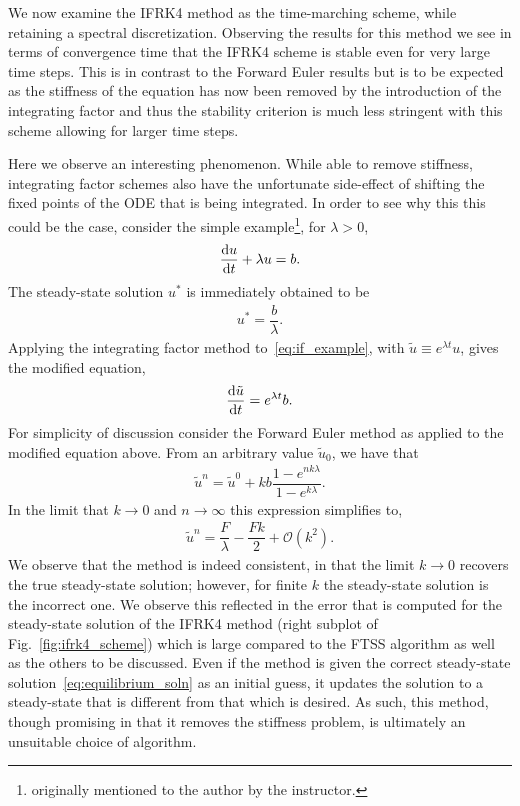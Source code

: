 \documentclass[11pt]{article}
\begin{document}
We now examine the IFRK4 method as the time-marching scheme, while retaining a spectral discretization. Observing the results for this method we see in terms of convergence time that the IFRK4 scheme is stable even for very large time steps. This is in contrast to the Forward Euler results but is to be expected as the stiffness of the equation has now been removed by the introduction of the integrating factor and thus the stability criterion is much less stringent with this scheme allowing for larger time steps. 

Here we observe an interesting phenomenon. While able to remove stiffness, integrating factor schemes also have the unfortunate side-effect of shifting the fixed points of the ODE that is being integrated. In order to see why this this could be the case, consider the simple example\footnote{originally mentioned to the author by the instructor.}, for $\lambda>0$,
\begin{align}
    \dv{u}{t} + \lambda u = b.\label{eq:if_example}
\end{align}
The steady-state solution $u^{*}$ is immediately obtained to be
\begin{align}
    u^{*} = \dfrac{b}{\lambda}.
\end{align}
Applying the integrating factor method to~\eqref{eq:if_example}, with $\tilde{u} \equiv e^{\lambda t}u$, gives the modified equation,
\begin{align}
    \dv{\tilde{u}}{t} = e^{\lambda t} b. \label{eq:if_mod_example}
\end{align}
For simplicity of discussion consider the Forward Euler method as applied to the modified equation above. From an arbitrary value $\tilde{u}_{0}$, we have that
\begin{align}
    \tilde{u}^{n} = \tilde{u}^{0} + kb\dfrac{1-e^{nk\lambda}}{1-e^{k\lambda}}.
\end{align} 
In the limit that $k\to 0$ and $n\to\infty$ this expression simplifies to,
\begin{align}
    \tilde{u}^{n} = \dfrac{F}{\lambda} - \dfrac{Fk}{2} + \mathcal{O}(k^{2}).
\end{align}
We observe that the method is indeed consistent, in that the limit $k\to 0$ recovers the true steady-state solution; however, for finite $k$ the steady-state solution is the incorrect one. We observe this reflected in the error that is computed for the steady-state solution of the IFRK4 method (right subplot of Fig.~\ref{fig:ifrk4_scheme}) which is large compared to the FTSS algorithm as well as the others to be discussed. Even if the method is given the correct steady-state solution~\eqref{eq:equilibrium_soln} as an initial guess, it updates the solution to a steady-state that is different from that which is desired. As such, this method, though promising in that it removes the stiffness problem, is ultimately an unsuitable choice of algorithm.\\
\end{document}
